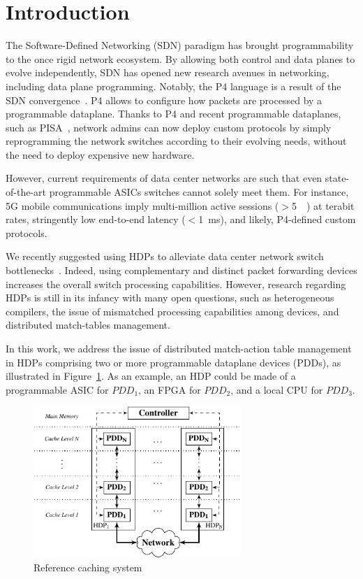 \section{Introduction}\label{sec:intro}

The Software-Defined Networking (SDN) paradigm has brought programmability to the once rigid network ecosystem.
By allowing both control and data planes to evolve independently, SDN has opened new research avenues in networking, including data plane programming.
Notably, the P4 language is a result of the SDN convergence~\cite{Bosshart:2014}.
P4 allows to configure how packets are processed by a programmable dataplane. 
Thanks to P4 and recent programmable dataplanes, such as PISA~\cite{Bosshart:2013}, network admins can now deploy custom protocols by simply reprogramming the network switches according to their evolving needs, without the need to deploy expensive new hardware. 


However, current requirements of data center networks are such that even state-of-the-art programmable ASICs switches cannot solely meet them.
For instance, 5G mobile communications imply multi-million active sessions ($>$\SI{5}{\mega\nothing}) at terabit rates, stringently low end-to-end latency ($<$\SI{1}{\milli\second}), and likely, P4-defined custom protocols.

We recently suggested using \acfp{HDP} to alleviate data center network switch bottlenecks~\cite{one_for_all}.
Indeed, using complementary and distinct packet forwarding devices increases the overall switch processing capabilities.
However, research regarding HDPs is still in its infancy with many open questions, such as heterogeneous compilers, the issue of mismatched processing capabilities among devices, and distributed match-tables management.

In this work, we address the issue of distributed match-action table management in HDPs comprising two or more programmable dataplane devices (PDDs), as illustrated in Figure~\ref{fig:high_level_network}.
As an example, an HDP could be made of a programmable ASIC for $PDD_1$, an  FPGA for $PDD_2$, and a local CPU for $PDD_3$.

\begin{figure}[]
	\centering
	\includegraphics[width=0.7\textwidth]{scheme_top.pdf}
	\caption{Reference caching system}
	\label{fig:high_level_network}
\end{figure}

